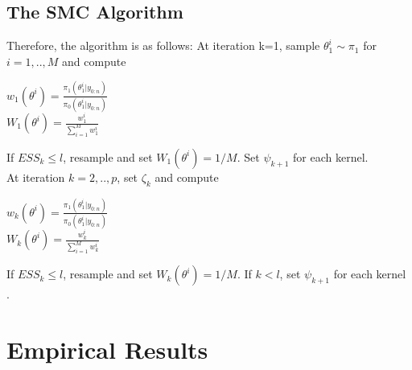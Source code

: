 \documentclass[12pt]{article}
\theoremstyle{definition}
\begin{document}
\subsection{The SMC Algorithm}
Therefore, the algorithm is as follows:
At iteration k=1, sample $\theta_{1}^{i} \sim \pi_{1}$ for $i=1,..,M$ and compute\\
\begin{center}
$w_{1}(\theta^{i}) = \frac{\pi_{1}(\theta_{1}^{i}|y_{0:n})}{\pi_{0}(\theta_{1}^{i}|y_{0:n})}$\\
$W_{1}(\theta^{i}) = \frac{w_{1}^{i}}{\sum_{i=1}^{M} w_{1}^{i}}$
\end{center}
If $ESS_{k} \leqslant l$, resample and set $W_{1}(\theta^{i}) = 1/M$. Set $\psi_{k+1}$ for each kernel. \\
\noindent At iteration $k=2,..,p$, set $\zeta_{k}$ and compute
\begin{center}
$w_{k}(\theta^{i}) = \frac{\pi_{1}(\theta_{1}^{i}|y_{0:n})}{\pi_{0}(\theta_{1}^{i}|y_{0:n})}$\\
$W_{k}(\theta^{i}) = \frac{w_{k}^{i}}{\sum_{i=1}^{M} w_{k}^{i}}$
\end{center}
If $ESS_{k} \leqslant l$, resample and set $W_{k}(\theta^{i}) = 1/M$. If $k < l$, set $\psi_{k+1}$ for each kernel \citep{jasra2011inference}.
\newpage
\section{Empirical Results}
\end{document}
